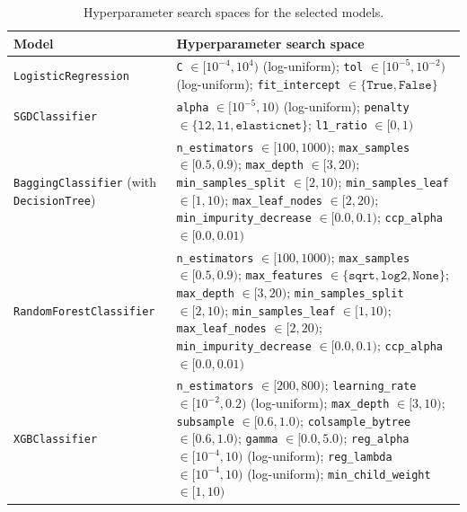 \documentclass[conference]{IEEEtran}
\begin{document}
\begin{table}[t]
\centering
\caption{Hyperparameter search spaces for the selected models.}\label{tab:model-search-space}
\begin{threeparttable}
\begin{tabular}{p{3cm} p{14.2cm}}

\toprule
\textbf{Model} & \textbf{Hyperparameter search space} \\

\midrule
\texttt{LogisticRegression} &
\texttt{C} \(\in [10^{-4}, 10^{4})\) (log-uniform); \texttt{tol} \(\in [10^{-5}, 10^{-2})\) (log-uniform); \texttt{fit\_intercept} \(\in \{\texttt{True}, \texttt{False}\}\) \\
\midrule

\texttt{SGDClassifier} &
\texttt{alpha} \(\in [10^{-5}, 10)\) (log-uniform); \texttt{penalty} \(\in \{\texttt{l2}, \texttt{l1}, \texttt{elasticnet}\}\); \texttt{l1\_ratio} \(\in [0, 1)\) \\
\midrule

\texttt{BaggingClassifier} (with \texttt{DecisionTree}) &
\texttt{n\_estimators} \(\in [100, 1000)\); \texttt{max\_samples} \(\in [0.5, 0.9)\);
\texttt{max\_depth} \(\in [3, 20)\); \texttt{min\_samples\_split} \(\in [2, 10)\); \texttt{min\_samples\_leaf} \(\in [1, 10)\);  \texttt{max\_leaf\_nodes} \(\in [2, 20)\); \texttt{min\_impurity\_decrease} \(\in [0.0, 0.1)\); \texttt{ccp\_alpha} \(\in [0.0, 0.01)\) \\
\midrule

\texttt{RandomForestClassifier} &
\texttt{n\_estimators} \(\in [100, 1000)\); \texttt{max\_samples} \(\in [0.5, 0.9)\); 
\texttt{max\_features} \(\in \{\texttt{sqrt}, \texttt{log2}, \texttt{None}\}\);
\texttt{max\_depth} \(\in [3, 20)\); \texttt{min\_samples\_split} \(\in [2, 10)\); \texttt{min\_samples\_leaf} \(\in [1, 10)\);  \texttt{max\_leaf\_nodes} \(\in [2, 20)\); \texttt{min\_impurity\_decrease} \(\in [0.0, 0.1)\); \texttt{ccp\_alpha} \(\in [0.0, 0.01)\) \\
\midrule

\texttt{XGBClassifier} &
\texttt{n\_estimators} \(\in [200, 800)\); \texttt{learning\_rate} \(\in [10^{-2}, 0.2)\) (log-uniform); \texttt{max\_depth} \(\in [3, 10)\); \texttt{subsample} \(\in [0.6, 1.0)\); \texttt{colsample\_bytree} \(\in [0.6, 1.0)\); \texttt{gamma} \(\in [0.0, 5.0)\); \texttt{reg\_alpha} \(\in [10^{-4}, 10)\) (log-uniform); \texttt{reg\_lambda} \(\in [10^{-4}, 10)\) (log-uniform); \texttt{min\_child\_weight} \(\in [1, 10)\) \\

\bottomrule
\end{tabular}
\end{threeparttable}
\end{table}
\end{document}
